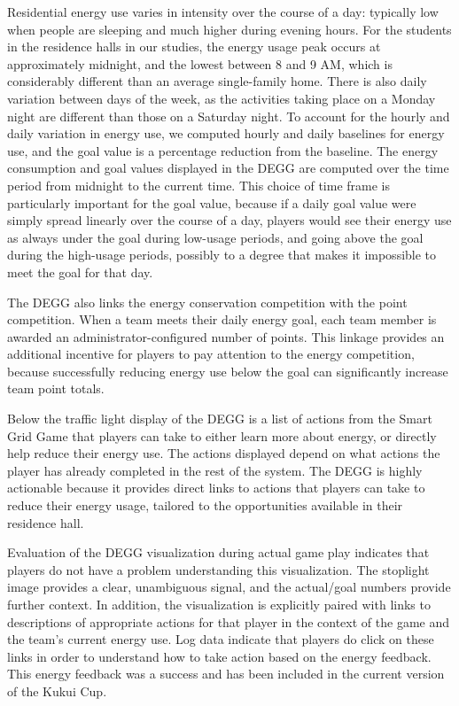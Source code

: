 \documentclass[10pt, conference, compsocconf]{IEEEtran-old}
\begin{document}
Residential energy use varies in intensity over the course of a day: typically low when people are sleeping and much higher during evening hours. For the students in the residence halls in our studies, the energy usage peak occurs at approximately midnight, and the lowest between 8 and 9 AM, which is considerably different than an average single-family home. There is also daily variation between days of the week, as the activities taking place on a Monday night are different than those on a Saturday night. To account for the hourly and daily variation in energy use, we computed hourly and daily baselines for energy use, and the goal value is a percentage reduction from the baseline. The energy consumption and goal values displayed in the DEGG are computed over the time period from midnight to the current time. This choice of time frame is particularly important for the goal value, because if a daily goal value were simply spread linearly over the course of a day, players would see their energy use as always under the goal during low-usage periods, and going above the goal during the high-usage periods, possibly to a degree that makes it impossible to meet the goal for that day.

The DEGG also links the energy conservation competition with the point competition. When a team meets their daily energy goal, each team member is awarded an administrator-configured number of points. This linkage provides an additional incentive for players to pay attention to the energy competition, because successfully reducing energy use below the goal can significantly increase team point totals.

Below the traffic light display of the DEGG is a list of actions from the Smart Grid Game that players can take to either learn more about energy, or directly help reduce their energy use. The actions displayed depend on what actions the player has already completed in the rest of the system. The DEGG is highly actionable because it provides direct links to actions that players can take to reduce their energy usage, tailored to the opportunities available in their residence hall.

Evaluation of the DEGG visualization during actual game play indicates that players do not have a problem understanding this visualization. The stoplight image provides a clear, unambiguous signal, and the actual/goal numbers provide further context. In addition, the visualization is explicitly paired with links to descriptions of appropriate actions for that player in the context of the game and the team's current energy use. Log data indicate that players do click on these links in order to understand how to take action based on the energy feedback. This energy feedback was a success and has been included in the current version of the Kukui Cup.
\end{document}
